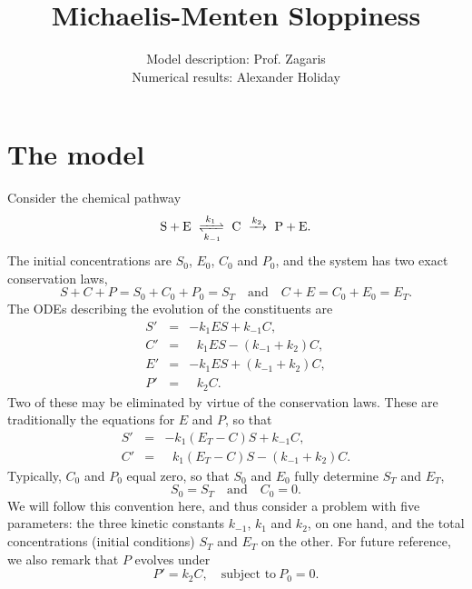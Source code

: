 \documentclass[11pt]{article}
\newcommand{\be}{\begin{equation}}
\newcommand{\ee}{\end{equation}}
\begin{document}
\title{Michaelis-Menten Sloppiness}
\author{Model description: Prof. Zagaris\\ Numerical results: Alexander Holiday}
\date{}
\maketitle

\section{The model}

Consider the chemical pathway
%
\[
 {\rm S + E}
\
 \xrightleftharpoons[k_{-1}]{k_1}
\
 {\rm C}
\
 \xrightarrow{k_2}
\
 {\rm P + E} .
\label{s2c2p}
\]
%
The initial concentrations are
$S_0$, $E_0$, $C_0$ and $P_0$,
and the system has two exact conservation laws,
%
\[
 S+C+P = S_0+C_0+P_0 = S_T
\quad\mbox{and}\quad
 C+E = C_0+E_0 = E_T .
\]
%
The ODEs describing the evolution of the constituents are
%
\be
\begin{array}{rclcl}
 S' &=& -k_1 E S + k_{-1} C ,
\\
 C' &=& \ \ \, k_1 E S - (k_{-1} + k_2) C ,
\\
 E' &=& -k_1 E S + (k_{-1} + k_2) C ,
\\
 P' &=& \ \ \, k_2 C .
\end{array}
\label{SCEP-ODE}
\ee
%
Two of these may be eliminated by virtue of the conservation laws.
These are traditionally the equations for $E$ and $P$,
so that
%
\be
\begin{array}{rclcl}
 S' &=& -k_1 (E_T-C) S + k_{-1} C ,
\\
 C' &=& \ \ \, k_1 (E_T-C) S - (k_{-1} + k_2) C .
\end{array}
\label{SC-ODE}
\ee
%
Typically, $C_0$ and $P_0$ equal zero,
so that $S_0$ and $E_0$ fully determine $S_T$ and $E_T$,
%
\be
 S_0 = S_T
\quad\mbox{and}\quad
 C_0 = 0 .
\label{SC-IP}
\ee
%
We will follow this convention here,
and thus consider a problem with five parameters:
the three kinetic constants $k_{-1}$, $k_1$ and $k_2$,
on one hand, and the total concentrations (initial conditions)
$S_T$ and $E_T$ on the other.
For future reference, we also remark that $P$ evolves under
%
\be
 P' = k_2 C ,
\quad\mbox{subject to}\
 P_0 = 0 .
\label{P-IVP}
\ee
%
\end{document}
